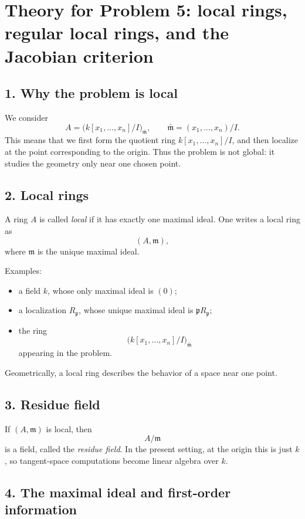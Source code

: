 \documentclass[12pt,a4paper]{article}
\theoremstyle{plain}
\theoremstyle{definition}      %
\begin{document}
	
	\section*{Theory for Problem 5: local rings, regular local rings, and the Jacobian criterion}
	
	\subsection*{1. Why the problem is local}
	
	We consider
	\[
	A=\bigl(k[x_1,\dots,x_n]/I\bigr)_{\bar{\mathfrak m}},
	\qquad
	\bar{\mathfrak m}=(x_1,\dots,x_n)/I.
	\]
	This means that we first form the quotient ring \(k[x_1,\dots,x_n]/I\), and then localize at the point corresponding to the origin. Thus the problem is not global: it studies the geometry only near one chosen point.
	
	\subsection*{2. Local rings}
	
	A ring \(A\) is called \emph{local} if it has exactly one maximal ideal. One writes a local ring as
	\[
	(A,\mathfrak m),
	\]
	where \(\mathfrak m\) is the unique maximal ideal.
	
	Examples:
	\begin{itemize}
		\item a field \(k\), whose only maximal ideal is \((0)\);
		\item a localization \(R_{\mathfrak p}\), whose unique maximal ideal is \(\mathfrak pR_{\mathfrak p}\);
		\item the ring
		\[
		\bigl(k[x_1,\dots,x_n]/I\bigr)_{\bar{\mathfrak m}}
		\]
		appearing in the problem.
	\end{itemize}
	
	Geometrically, a local ring describes the behavior of a space near one point.
	
	\subsection*{3. Residue field}
	
	If \((A,\mathfrak m)\) is local, then
	\[
	A/\mathfrak m
	\]
	is a field, called the \emph{residue field}. In the present setting, at the origin this is just \(k\), so tangent-space computations become linear algebra over \(k\).
	
	\subsection*{4. The maximal ideal and first-order information}
	
\end{document}
